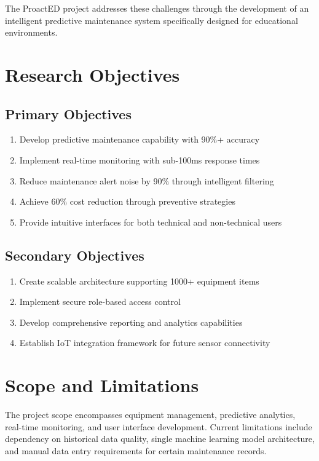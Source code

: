 \documentclass[12pt,a4paper]{report}
\begin{document}
The ProactED project addresses these challenges through the development of an intelligent predictive maintenance system specifically designed for educational environments.

\section{Research Objectives}

\subsection{Primary Objectives}
\begin{enumerate}
    \item Develop predictive maintenance capability with 90\%+ accuracy
    \item Implement real-time monitoring with sub-100ms response times
    \item Reduce maintenance alert noise by 90\% through intelligent filtering
    \item Achieve 60\% cost reduction through preventive strategies
    \item Provide intuitive interfaces for both technical and non-technical users
\end{enumerate}

\subsection{Secondary Objectives}
\begin{enumerate}
    \item Create scalable architecture supporting 1000+ equipment items
    \item Implement secure role-based access control
    \item Develop comprehensive reporting and analytics capabilities
    \item Establish IoT integration framework for future sensor connectivity
\end{enumerate}

\section{Scope and Limitations}

The project scope encompasses equipment management, predictive analytics, real-time monitoring, and user interface development. Current limitations include dependency on historical data quality, single machine learning model architecture, and manual data entry requirements for certain maintenance records.
\end{document}
